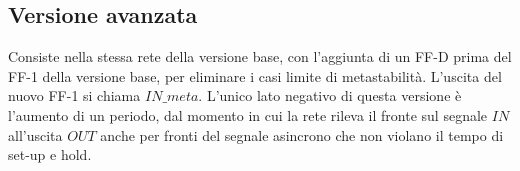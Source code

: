 \documentclass{subfiles}
\begin{document}
\subsection{Versione avanzata}

Consiste nella stessa rete della versione base, con l'aggiunta di un FF-D prima del FF-1 della versione base, per eliminare i casi limite di metastabilità.
L'uscita del nuovo FF-1 si chiama $IN\_meta$.
L'unico lato negativo di questa versione è l'aumento di un periodo, dal momento in cui la rete rileva il fronte sul segnale $IN$ all'uscita $OUT$ anche per fronti del segnale asincrono che non violano il tempo di set-up e hold.
\end{document}
